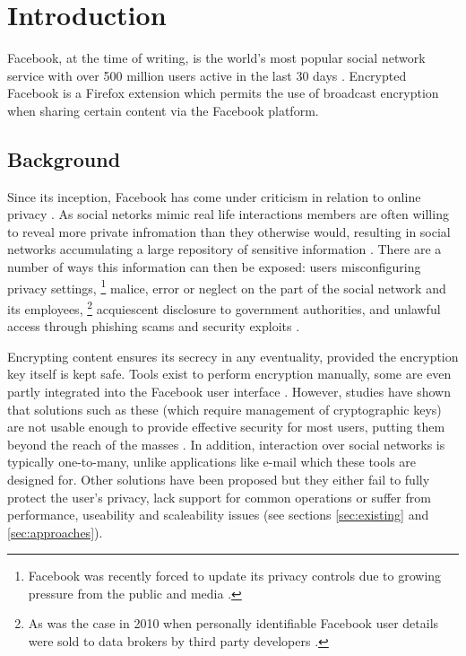 \chapter{Introduction}\label{ch:introduction}

Facebook, at the time of writing, is the world's most popular social network service with over 500 million users active in the last 30 days \cite{fb-factsheet}. Encrypted Facebook is a Firefox extension which permits the use of broadcast encryption when sharing certain content via the Facebook platform.


\section{Background}
\label{sec:background}

Since its inception, Facebook has come under criticism in relation to online privacy \cite{fb-cipc}. As social netorks mimic real life interactions members are often willing to reveal more private infromation than they otherwise would, resulting in social networks accumulating a large repository of sensitive information \cite{gross}. There are a number of ways this information can then be exposed: users misconfiguring privacy settings, \footnote{Facebook was recently forced to update its privacy controls due to growing pressure from the public and media \cite{fb-priv}.} malice, error or neglect on the part of the social network and its employees, \footnote{As was the case in 2010 when personally identifiable Facebook user details were sold to data brokers by third party developers \cite{fb-ids}.} acquiescent disclosure to government authorities, and unlawful access through phishing scams and security exploits \cite{snoop} \cite{fb-gov} \cite{fb-phish} \cite{rockyou}.

Encrypting content ensures its secrecy in any eventuality, provided the encryption key itself is kept safe. Tools exist to perform encryption manually, some are even partly integrated into the Facebook user interface \cite{firegpg}. However, studies have shown that solutions such as these (which require management of cryptographic keys) are not usable enough to provide effective security for most users, putting them beyond the reach of the masses \cite{johhny}. In addition, interaction over social networks is typically one-to-many, unlike applications like e-mail which these tools are designed for. Other solutions have been proposed but they either fail to fully protect the user's privacy, lack support for common operations or suffer from performance, useability and scaleability issues (see sections \ref{sec:existing} and \ref{sec:approaches}).
  
